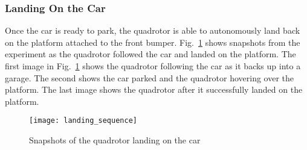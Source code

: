 
\subsubsection{Landing On the Car}

Once the car is ready to park, the quadrotor is able to autonomously land back
on the platform attached to the front bumper. Fig.~\ref{fig:landing} shows
snapshots from the experiment as the quadrotor followed the car and landed on
the platform. The first image in Fig.~\ref{fig:landing} shows the quadrotor
following the car as it backs up into a garage. The second shows the car parked
and the quadrotor hovering over the platform. The last image shows the
quadrotor after it successfully landed on the platform.

\begin{figure}[h!]

    \centering

    \centerline{\texttt{[image: landing\_sequence]}}

    \caption{Snapshots of the quadrotor landing on the car}

    \label{fig:landing}

\end{figure}
